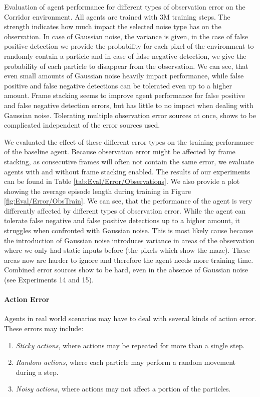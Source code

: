 \begin{table}[ht!]
    \caption[Evaluation of the Influence of Observation Error]{Evaluation of agent performance for different types of observation error on the Corridor environment. All agents are trained with 3M training steps. The strength indicates how much impact the selected noise type has on the observation. In case of Gaussian noise, the variance is given, in the case of false positive detection we provide the probability for each pixel of the environment to randomly contain a particle and in case of false negative detection, we give the probability of each particle to disappear from the observation. We can see, that even small amounts of Gaussian noise heavily impact performance, while false positive and false negative detections can be tolerated even up to a higher amount. Frame stacking seems to improve agent performance for false positive and false negative detection errors, but has little to no impact when dealing with Gaussian noise. Tolerating multiple observation error sources at once, shows to be complicated independent of the error sources used.} \label{tab:Eval/Error/Observations}
\end{table}


We evaluated the effect of these different error types on the training performance of the baseline agent. Because observation error might be affected by frame stacking, as consecutive frames will often not contain the same error, we evaluate agents with and without frame stacking enabled. The results of our experiments can be found in Table \ref{tab:Eval/Error/Observations}. We also provide a plot showing the average episode length during training in Figure \ref{fig:Eval/Error/ObsTrain}. We can see, that the performance of the agent is very differently affected by different types of observation error. While the agent can tolerate false negative and false positive detections up to a higher amount, it struggles when confronted with Gaussian noise. This is most likely cause because the introduction of Gaussian noise introduces variance in areas of the observation where we only had static inputs before (the pixels which show the maze). These areas now are harder to ignore and therefore the agent needs more training time. Combined error sources show to be hard, even in the absence of Gaussian noise (see Experiments 14 and 15). 

\paragraph{Action Error}
Agents in real world scenarios may have to deal with several kinds of action error. These errors may include:
\begin{enumerate}
    \item \textit{Sticky actions}, where actions may be repeated for more than a single step.
    \item \textit{Random actions}, where each particle may perform a random movement during a step.
    \item \textit{Noisy actions}, where actions may not affect a portion of the particles.
\end{enumerate}

